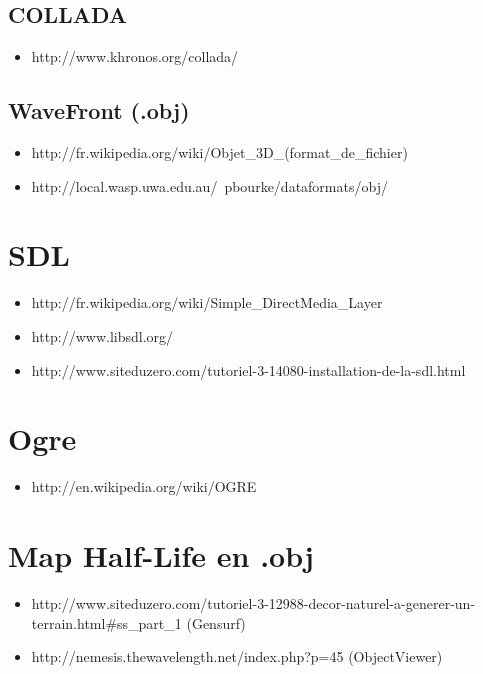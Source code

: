 \documentclass[a4paper,12pt]{report}
\begin{document}
\subsection*{COLLADA}
\begin{itemize}
 \item http://www.khronos.org/collada/
\end{itemize}

\subsection*{WaveFront (.obj)}
\begin{itemize}
 \item http://fr.wikipedia.org/wiki/Objet\_3D\_(format\_de\_fichier)
 
 \item http://local.wasp.uwa.edu.au/~pbourke/dataformats/obj/
\end{itemize}


\section*{SDL}
\begin{itemize}
 \item http://fr.wikipedia.org/wiki/Simple\_DirectMedia\_Layer

 \item http://www.libsdl.org/

 \item http://www.siteduzero.com/tutoriel-3-14080-installation-de-la-sdl.html
\end{itemize}


\section*{Ogre}
\begin{itemize}
 \item http://en.wikipedia.org/wiki/OGRE
\end{itemize}
   

\section*{Map Half-Life en .obj}
\begin{itemize}
 \item http://www.siteduzero.com/tutoriel-3-12988-decor-naturel-a-generer-un-terrain.html\#ss\_part\_1 (Gensurf)
 
 \item http://nemesis.thewavelength.net/index.php?p=45 (ObjectViewer)
\end{itemize}
\end{document}
